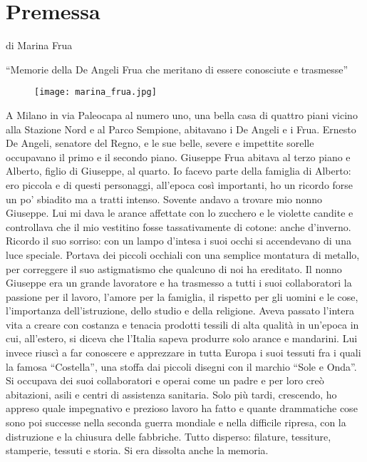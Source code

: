\chapter*{Premessa}
\graphicspath{ {./images/primepagine/} }

di Marina Frua

“Memorie della De Angeli Frua che meritano di essere conosciute e trasmesse”

\begin{figure}[h]
	\centering
		\texttt{[image: marina\_frua.jpg]}
	\caption{}
	\label{fig:marina_frua}
\end{figure}

A Milano in via Paleocapa al numero uno, una bella casa di quattro piani vicino alla Stazione Nord e al Parco Sempione, abitavano i De Angeli e i Frua.
   Ernesto De Angeli, senatore del Regno, e le sue belle, severe e impettite sorelle occupavano il primo e il secondo piano. Giuseppe Frua abitava al terzo piano e Alberto, figlio di Giuseppe, al quarto.
   Io facevo parte della famiglia di Alberto: ero piccola e di questi personaggi, all’epoca così importanti, ho un ricordo forse un po’ sbiadito ma a tratti intenso. 
   Sovente andavo a trovare mio nonno Giuseppe. Lui mi dava le arance affettate con lo zucchero e le violette candite e controllava che il mio vestitino fosse tassativamente di cotone: anche d’inverno. Ricordo il suo sorriso: con un lampo d’intesa i suoi occhi si accendevano di una luce speciale. Portava dei piccoli occhiali con una semplice montatura di metallo, per correggere il suo astigmatismo che qualcuno di noi ha ereditato.
   Il nonno Giuseppe era un grande lavoratore e ha trasmesso a tutti i suoi collaboratori la passione per il lavoro, l’amore per la famiglia, il rispetto per gli uomini e le cose, l’importanza dell’istruzione, dello studio e della religione. Aveva passato l’intera vita a creare con costanza e tenacia prodotti tessili di alta qualità in un’epoca in cui, all’estero, si diceva che l’Italia sapeva produrre solo arance e mandarini. Lui invece riuscì a far conoscere e apprezzare in tutta Europa i suoi tessuti fra i quali la famosa “Costella”, una stoffa dai piccoli disegni con il marchio “Sole e Onda”.
   Si occupava dei suoi collaboratori e operai come un padre e per loro creò abitazioni, asili e centri di assistenza sanitaria. Solo più tardi, crescendo, ho appreso quale impegnativo e prezioso lavoro ha fatto e quante drammatiche cose sono poi successe nella seconda guerra mondiale e nella difficile ripresa, con la distruzione e la chiusura delle fabbriche. Tutto disperso: filature, tessiture, stamperie, tessuti e storia. Si era dissolta anche la memoria.  
